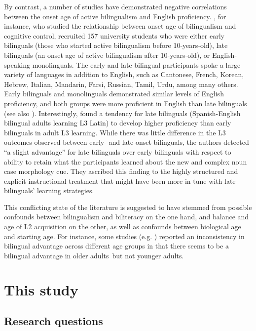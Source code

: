 \documentclass[output=paper,modfonts,nonflat,newtxmath]{langsci/langscibook}
\begin{document}
By contrast, a number of studies have demonstrated negative correlations between the onset age of active bilingualism and English proficiency. \citet{LukEtAl2011}, for instance, who studied the relationship between onset age of bilingualism and cognitive control, recruited 157 university students who were either early bilinguals (those who started active bilingualism before 10-years-old), late bilinguals (an onset age of active bilingualism after 10-years-old), or English-speaking monolinguals. The early and late bilingual participants spoke a large variety of languages in addition to English, such as Cantonese, French, Korean, Hebrew, Italian, Mandarin, Farsi, Russian, Tamil, Urdu, among many others. Early bilinguals and monolinguals demonstrated similar levels of English proficiency, and both groups were more proficient in English than late bilinguals (see also \citealt{SoveriEtAl2011}). Interestingly, \citet[179]{StaffordEtAl2010} found a tendency for late bilinguals (Spanish-English bilingual adults learning L3 Latin) to develop higher proficiency than early bilinguals in adult L3 learning. While there was little difference in the L3 outcomes observed between early- and late-onset bilinguals, the authors detected “a slight advantage” for late bilinguals over early bilinguals with respect to ability to retain what the participants learned about the new and complex noun case morphology cue. They ascribed this finding to the highly structured and explicit instructional treatment that might have been more in tune with late bilinguals’ learning strategies.

This conflicting state of the literature is suggested to have stemmed from possible confounds between bilingualism and biliteracy on the one hand, and balance and age of L2 acquisition on the other, as well as confounds between biological age and starting age. For instance, some studies (e.g. \citealt{BialystokEtAl2005b}) reported an inconsistency in bilingual advantage across different age groups in that there seems to be a bilingual advantage in older adults~but not younger adults.

\section{This study}
\label{sec:pfenninger:3}

\subsection{Research questions}
\label{sec:pfenninger:3.1.}
\largerpage
\end{document}
